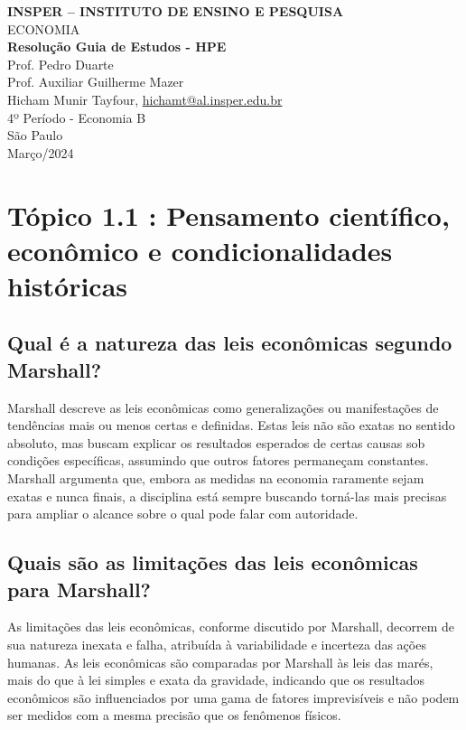 \documentclass[12pt]{article}
\begin{document}
\begin{titlepage}
    \centering
    \vspace*{1cm}
    \Large\textbf{INSPER – INSTITUTO DE ENSINO E PESQUISA}\\
    \Large ECONOMIA\\
    \vspace{1.5cm}
    \Large\textbf{Resolução Guia de Estudos - HPE}\\
    \vspace{1.5cm}
    Prof. Pedro Duarte\\
    Prof. Auxiliar Guilherme Mazer\\
    \vfill
    \normalsize
    Hicham Munir Tayfour, \href{mailto:hichamt@al.insper.edu.br}{hichamt@al.insper.edu.br}\\
    4º Período - Economia B\\
    \vfill
    São Paulo\\
    Março/2024
\end{titlepage}

\newpage
\tableofcontents
\thispagestyle{empty} %
\newpage
\setcounter{page}{1} %
\justify
\onehalfspacing

\pagestyle{fancy}
\fancyhf{}
\rhead{\thepage}

\section{\textbf{Tópico 1.1 : Pensamento científico, econômico e condicionalidades históricas}}
\subsection{\textbf{Qual é a natureza das leis econômicas segundo Marshall?}}
Marshall descreve as leis econômicas como generalizações ou manifestações de tendências mais ou menos certas e definidas. Estas leis não são exatas no sentido absoluto, mas buscam explicar os resultados esperados de certas causas sob condições específicas, assumindo que outros fatores permaneçam constantes. Marshall argumenta que, embora as medidas na economia raramente sejam exatas e nunca finais, a disciplina está sempre buscando torná-las mais precisas para ampliar o alcance sobre o qual pode falar com autoridade.
\subsection{\textbf{Quais são as limitações das leis econômicas para Marshall?}}
As limitações das leis econômicas, conforme discutido por Marshall, decorrem de sua natureza inexata e falha, atribuída à variabilidade e incerteza das ações humanas. As leis econômicas são comparadas por Marshall às leis das marés, mais do que à lei simples e exata da gravidade, indicando que os resultados econômicos são influenciados por uma gama de fatores imprevisíveis e não podem ser medidos com a mesma precisão que os fenômenos físicos.
\end{document}
